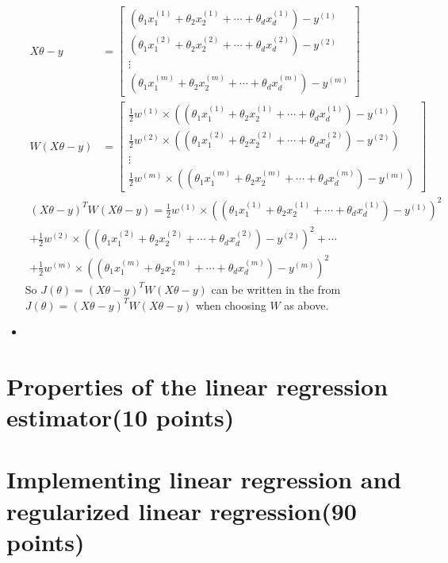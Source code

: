 \documentclass{article}
\begin{document}
\begin{itemize}
\begin{align*}
    X\theta - y &= \begin{bmatrix}
    (\theta_{1}x_{1}^{(1)} + \theta_{2}x_{2}^{(1)} + \cdots + \theta_{d}x_{d}^{(1)})-y^{(1)}\\
    (\theta_{1}x_{1}^{(2)} + \theta_{2}x_{2}^{(2)} + \cdots + \theta_{d}x_{d}^{(2)})-y^{(2)}\\
    \vdots\\
    (\theta_{1}x_{1}^{(m)} + \theta_{2}x_{2}^{(m)} + \cdots + \theta_{d}x_{d}^{(m)})-y^{(m)}
    \end{bmatrix}\\
    W(X\theta - y) &= \begin{bmatrix}
    \frac{1}{2}w^{(1)}\times((\theta_{1}x_{1}^{(1)} + \theta_{2}x_{2}^{(1)} + \cdots + \theta_{d}x_{d}^{(1)})-y^{(1)})\\
    \frac{1}{2}w^{(2)}\times((\theta_{1}x_{1}^{(2)} + \theta_{2}x_{2}^{(2)} + \cdots + \theta_{d}x_{d}^{(2)})-y^{(2)})\\
    \vdots\\
    \frac{1}{2}w^{(m)}\times((\theta_{1}x_{1}^{(m)} + \theta_{2}x_{2}^{(m)} + \cdots + \theta_{d}x_{d}^{(m)})-y^{(m)})
    \end{bmatrix}
\end{align*}
\begin{align*}
    (X\theta - y) ^ {T} W(X\theta - y)=
    \frac{1}{2}w^{(1)}\times((\theta_{1}x_{1}^{(1)} + \theta_{2}x_{2}^{(1)} + \cdots + \theta_{d}x_{d}^{(1)})-y^{(1)})^2\\
    +\frac{1}{2}w^{(2)}\times((\theta_{1}x_{1}^{(2)} + \theta_{2}x_{2}^{(2)} + \cdots + \theta_{d}x_{d}^{(2)})-y^{(2)})^2+\cdots\\
    +\frac{1}{2}w^{(m)}\times((\theta_{1}x_{1}^{(m)} + \theta_{2}x_{2}^{(m)} + \cdots + \theta_{d}x_{d}^{(m)})-y^{(m)})^2
\end{align*}
So $J(\theta) = (X \theta - y)^{T}W(X\theta - y)$ can be written in the from $J(\theta) = (X \theta - y)^{T}W(X\theta - y)$ when choosing $W$ as above.

\item 
\end{itemize}
\section{Properties of the linear regression estimator(10 points)}
\section{Implementing linear regression and regularized linear regression(90 points)}
\end{document}
